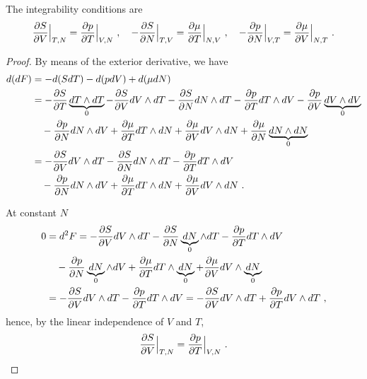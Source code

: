     The integrability conditions are 
    \begin{equation}\label{intcondhel}
        \frac{\partial S}{\partial V} \Big \vert_{T,N} = \frac{\partial p}{\partial T} \Big \vert_{V,N} ~, \quad 
        - \frac{\partial S}{\partial N} \Big \vert_{T,V} = \frac{\partial\mu}{\partial T} \Big \vert_{N, V} ~, \quad 
        - \frac{\partial p}{\partial N} \Big \vert_{V,T} = \frac{\partial\mu}{\partial V} \Big \vert_{N, T} ~. 
    \end{equation}
    \begin{proof}
        By means of the exterior derivative, we have 
        \begin{equation*}
        \begin{aligned}
            d (dF) & = - d (S dT) - d (p dV) + d (\mu dN) \\ & = - \frac{\partial S}{\partial T} \underbrace{dT \wedge dT}_0 - \frac{\partial S}{\partial V} dV \wedge dT - \frac{\partial S}{\partial N} dN \wedge dT - \frac{\partial p}{\partial T} dT \wedge dV - \frac{\partial p}{\partial V} \underbrace{dV \wedge dV}_0 \\ & \quad - \frac{\partial p}{\partial N} dN \wedge dV + \frac{\partial\mu}{\partial T} dT \wedge dN + \frac{\partial\mu}{\partial V} dV \wedge dN + \frac{\partial\mu}{\partial N} \underbrace{dN \wedge dN}_0 \\ & = - \frac{\partial S}{\partial V} dV \wedge dT - \frac{\partial S}{\partial N} dN \wedge dT - \frac{\partial p}{\partial T} dT \wedge dV \\ & \quad - \frac{\partial p}{\partial N} dN \wedge dV + \frac{\partial\mu}{\partial T} dT \wedge dN + \frac{\partial\mu}{\partial V} dV \wedge dN ~.
        \end{aligned}
        \end{equation*}

        At constant $N$ 
        \begin{equation*}
        \begin{aligned}
            0 & = d^2 F = - \frac{\partial S}{\partial V} dV \wedge dT - \frac{\partial S}{\partial N} \underbrace{dN}_0 \wedge dT - \frac{\partial p}{\partial T} dT \wedge dV \\ & \quad - \frac{\partial p}{\partial N} \underbrace{dN}_0 \wedge dV + \frac{\partial\mu}{\partial T} dT \wedge \underbrace{dN}_0 + \frac{\partial\mu}{\partial V} dV \wedge \underbrace{dN}_0 \\ & = - \frac{\partial S}{\partial V} dV \wedge dT - \frac{\partial p}{\partial T} dT \wedge dV = - \frac{\partial S}{\partial V} dV \wedge dT + \frac{\partial p}{\partial T} dV \wedge dT  ~,
        \end{aligned}
        \end{equation*}
        hence, by the linear independence of $V$ and $T$,
        \begin{equation*}
            \frac{\partial S}{\partial V} \Big \vert_{T,N} = \frac{\partial p}{\partial T} \Big \vert_{V,N} ~.
        \end{equation*}


\end{proof}
